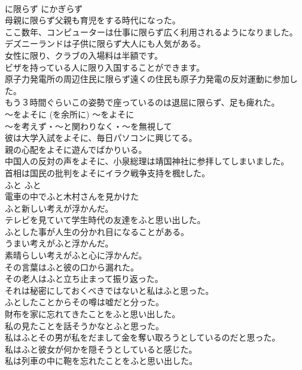 \documentclass[8pt]{extreport}
\begin{document}
\begin{CJK}{UTF8}{min}
\\	に限らず	にかぎらず	
\\	母親に限らず父親も育児をする時代になった。  
\\	ここ数年、コンピューターは仕事に限らず広く利用されるようになりました。   
\\	デズニーランドは子供に限らず大人にも人気がある。  
\\	女性に限り、クラブの入場料は半額です。   
\\	ビザを持っている人に限り入国することができます。   
\\	原子力発電所の周辺住民に限らず遠くの住民も原子力発電の反対運動に参加した。  
\\	もう３時間ぐらいこの姿勢で座っているのは退屈に限らず、足も痺れた。  
\\	〜をよそに (を余所に)	〜をよそに	
\\	〜を考えず・〜と関わりなく・〜を無視して	
\\	彼は大学入試をよそに、毎日パソコンに興じてる。  
\\	親の心配をよそに遊んでばかりいる。  
\\	中国人の反対の声をよそに、小泉総理は靖国神社に参拝してしまいました。  
\\	首相は国民の批判をよそにイラク戦争支持を楓ｾした。  
\\	ふと	ふと	
\\	電車の中でふと木村さんを見かけた  
\\	ふと新しい考えが浮かんだ。  
\\	テレビを見ていて学生時代の友達をふと思い出した。  
\\	ふとした事が人生の分かれ目になることがある。  
\\	うまい考えがふと浮かんだ。  
\\	素晴らしい考えがふと心に浮かんだ。  
\\	その言葉はふと彼の口から漏れた。  
\\	その老人はふと立ち止まって振り返った。  
\\	それは秘密にしておくべきではないと私はふと思った。  
\\	ふとしたことからその噂は嘘だと分った。  
\\	財布を家に忘れてきたことをふと思い出した。  
\\	私の見たことを話そうかなとふと思った。  
\\	私はふとその男が私をだまして金を奪い取ろうとしているのだと思った。  
\\	私はふと彼女が何かを隠そうとしていると感じた。  
\\	私は列車の中に鞄を忘れたことをふと思い出した。  

\end{CJK}
\end{document}
